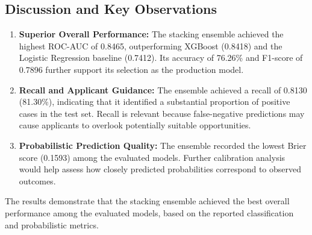 
\subsection{Discussion and Key Observations}

\begin{enumerate}

    \item \textbf{Superior Overall Performance:}
    The stacking ensemble achieved the highest ROC-AUC of 0.8465,
    outperforming XGBoost (0.8418) and the Logistic Regression
    baseline (0.7412). Its accuracy of 76.26\% and F1-score of
    0.7896 further support its selection as the production model.

    \item \textbf{Recall and Applicant Guidance:}
    The ensemble achieved a recall of 0.8130 (81.30\%), indicating
    that it identified a substantial proportion of positive cases
    in the test set. Recall is relevant because false-negative
    predictions may cause applicants to overlook potentially
    suitable opportunities.

    \item \textbf{Probabilistic Prediction Quality:}
    The ensemble recorded the lowest Brier score (0.1593) among
    the evaluated models. Further calibration analysis would help
    assess how closely predicted probabilities correspond to
    observed outcomes.

\end{enumerate}

The results demonstrate that the stacking ensemble achieved the
best overall performance among the evaluated models, based on
the reported classification and probabilistic metrics.


